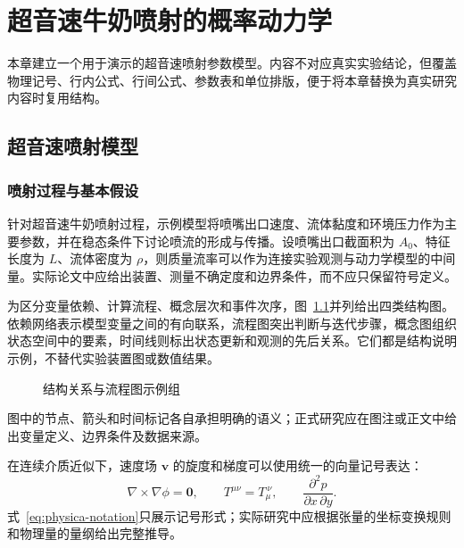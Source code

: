 \chapter{超音速牛奶喷射的概率动力学}

本章建立一个用于演示的超音速喷射参数模型。内容不对应真实实验结论，但覆盖物理记号、行内公式、行间公式、参数表和单位排版，便于将本章替换为真实研究内容时复用结构。

\section{超音速喷射模型}

\subsection{喷射过程与基本假设}

针对超音速牛奶喷射过程，示例模型将喷嘴出口速度、流体黏度和环境压力作为主要参数，并在稳态条件下讨论喷流的形成与传播。设喷嘴出口截面积为 $A_0$、特征长度为 $L$、流体密度为 $\rho$，则质量流率可以作为连接实验观测与动力学模型的中间量。实际论文中应给出装置、测量不确定度和边界条件，而不应只保留符号定义。

为区分变量依赖、计算流程、概念层次和事件次序，图~\ref{fig:ch2-schematics}并列给出四类结构图。依赖网络表示模型变量之间的有向联系，流程图突出判断与迭代步骤，概念图组织状态空间中的要素，时间线则标出状态更新和观测的先后关系。它们都是结构说明示例，不替代实验装置图或数值结果。
\begin{figure}[htbp]
  \centering
  
  \caption{结构关系与流程图示例组}
  \label{fig:ch2-schematics}
\end{figure}

图中的节点、箭头和时间标记各自承担明确的语义；正式研究应在图注或正文中给出变量定义、边界条件及数据来源。

在连续介质近似下，速度场 $\bm{v}$ 的旋度和梯度可以使用统一的向量记号表达：
\begin{equation}
  \nabla\times\nabla\phi=\bm{0},\qquad
  T^{\mu\nu}=T_{\mu}^{\ \nu},\qquad
  \frac{\partial^2p}{\partial x\,\partial y}.
  \label{eq:physica-notation}
\end{equation}
式~\eqref{eq:physica-notation}只展示记号形式；实际研究中应根据张量的坐标变换规则和物理量的量纲给出完整推导。

